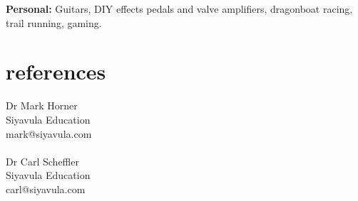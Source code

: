 \documentclass[]{friggeri-cv} %
\begin{document}
\textbf{Personal:} Guitars, DIY effects pedals and valve amplifiers, dragonboat racing, trail running, gaming.



\section{references}

Dr Mark Horner\\
Siyavula Education\\
mark@siyavula.com\\
\\
Dr Carl Scheffler\\
Siyavula Education\\
carl@siyavula.com\\
\end{document}
